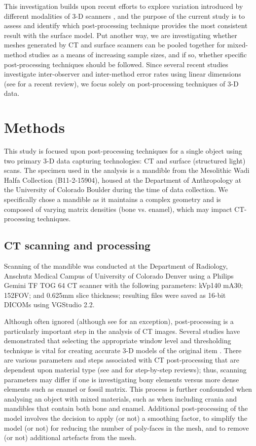 \documentclass[review]{elsarticle}
\begin{document}
This investigation builds upon recent efforts to explore variation introduced by different modalities of 3-D scanners \citet{RN11522}, and the purpose of the current study is to assess and identify which post-processing technique provides the most consistent result with the surface model. Put another way, we are investigating whether meshes generated by CT and surface scanners can be pooled together for mixed-method studies as a means of increasing sample sizes, and if so, whether specific post-processing techniques should be followed. Since several recent studies investigate inter-observer and inter-method error rates using linear dimensions (see \citealt{RN11945} for a recent review), we focus solely on post-processing techniques of 3-D data. 

\section*{Methods}

This study is focused upon post-processing techniques for a single object using two primary 3-D data capturing technologies: CT and surface (structured light) scans. The specimen used in the analysis is a mandible from the Mesolithic Wadi Halfa Collection  (B11-2-15904), housed at the Department of Anthropology at the University of Colorado Boulder during the time of data collection. We specifically chose a mandible as it maintains a complex geometry and is composed of varying matrix densities (bone vs. enamel), which may impact CT-processing techniques.

\subsection*{CT scanning and processing}

Scanning of the mandible was conducted at the Department of Radiology, Anschutz Medical Campus of University of Colorado Denver using a Philips Gemini TF TOG 64 CT scanner with the following parameters: kVp140 mA30; 152FOV; and 0.625mm slice thickness; resulting files were saved as 16-bit DICOMs using VGStudio 2.2. 

Although often ignored (although see \citealt{RN8984} for an exception), post-processing is a particularly important step in the analysis of CT images. Several studies have demonstrated that selecting the appropriate window level and thresholding technique is vital for creating accurate 3-D models of the original item \citep{RN11483,RN11485,RN11486}. There are various parameters and steps associated with CT post-processing that are dependent upon material type (see \citealt{RN11484} and \citealt{RN11478} for step-by-step reviews); thus, scanning parameters may differ if one is investigating bony elements versus more dense elements such as enamel or fossil matrix. This process is further confounded when analysing an object with mixed materials, such as when including crania and mandibles that contain both bone and enamel. Additional post-processing of the model involves the decision to apply (or not) a smoothing factor, to simplify the model (or not) for reducing the number of poly-faces in the mesh, and to  remove (or not) additional artefacts from the mesh. 
\end{document}
